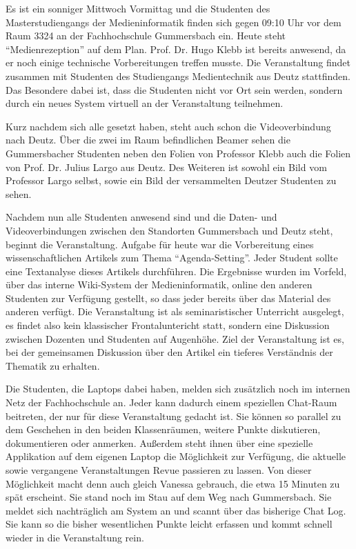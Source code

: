   \begin{kasten}
    \label{msec:narrative_beschreibung_der_situation}
    
      Es ist ein sonniger Mittwoch Vormittag und die Studenten des Masterstudiengangs der Medieninformatik finden sich gegen 09:10 Uhr vor dem Raum 3324 an der Fachhochschule Gummersbach ein. Heute steht "`Medienrezeption"' auf dem Plan. Prof. Dr. Hugo Klebb ist bereits anwesend, da er noch einige technische Vorbereitungen treffen musste. Die Veranstaltung  findet zusammen mit Studenten des Studiengangs Medientechnik aus Deutz stattfinden. Das Besondere dabei ist, dass die Studenten nicht vor Ort sein werden, sondern durch ein neues System virtuell an der Veranstaltung teilnehmen.

      Kurz nachdem sich alle gesetzt haben, steht auch schon die Videoverbindung nach Deutz. Über die zwei im Raum befindlichen Beamer sehen die Gummersbacher Studenten neben den Folien von Professor Klebb auch die Folien von Prof. Dr. Julius Largo aus Deutz. Des Weiteren ist sowohl ein Bild vom Professor Largo selbst, sowie ein Bild der versammelten Deutzer Studenten zu sehen.
  
      Nachdem nun alle Studenten anwesend sind und die Daten- und Videoverbindungen zwischen den Standorten Gummersbach und Deutz steht, beginnt die Veranstaltung. Aufgabe für heute war die Vorbereitung eines wissenschaftlichen Artikels zum Thema "`Agenda-Setting"'. Jeder Student sollte eine Textanalyse dieses Artikels durchführen. Die Ergebnisse wurden im Vorfeld, über das interne Wiki-System der Medieninformatik, online den anderen Studenten zur Verfügung gestellt, so dass jeder bereits über das Material des anderen verfügt. Die Veranstaltung ist als seminaristischer Unterricht ausgelegt, es findet also kein klassischer Frontaluntericht statt, sondern  eine Diskussion zwischen Dozenten und Studenten auf Augenhöhe. Ziel der Veranstaltung ist es, bei der gemeinsamen Diskussion über den Artikel ein tieferes Verständnis der Thematik zu erhalten.

      Die Studenten, die Laptops dabei haben, melden sich zusätzlich noch im internen Netz der Fachhochschule an. Jeder kann dadurch einem speziellen Chat-Raum beitreten, der nur für diese Veranstaltung gedacht ist. Sie können so parallel zu dem Geschehen in den beiden Klassenräumen, weitere Punkte diskutieren, dokumentieren oder anmerken. Außerdem steht ihnen über eine spezielle Applikation auf dem eigenen Laptop die Möglichkeit zur Verfügung, die aktuelle sowie vergangene Veranstaltungen Revue passieren zu lassen. Von dieser Möglichkeit macht denn auch gleich Vanessa gebrauch, die etwa 15 Minuten zu spät erscheint. Sie stand noch im Stau auf dem Weg nach Gummersbach. Sie meldet sich nachträglich am System an und scannt über das bisherige Chat Log. Sie kann so die bisher wesentlichen Punkte leicht erfassen und kommt schnell wieder in die Veranstaltung rein.


\end{kasten}

